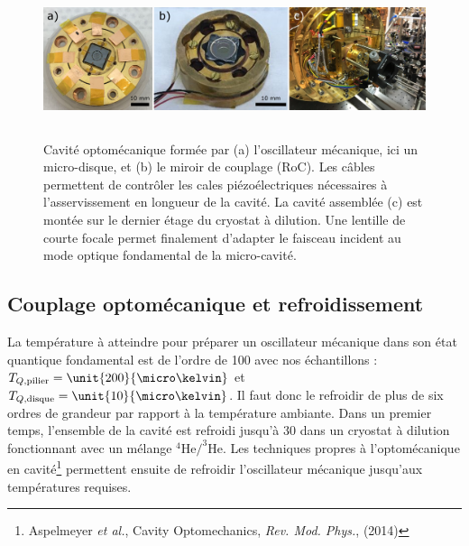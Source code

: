\documentclass[12pt,a4paper]{article}
\newcommand{\uroc}{\micro RoC}
\begin{document}
\begin{figure}
\center
\includegraphics[height=129pt]{figures/optomechanical_cavity.png}
\caption{Cavité optomécanique formée par (a) l'oscillateur mécanique, ici un micro-disque, et (b) le miroir de couplage (\uroc).
Les câbles permettent de contrôler les cales piézoélectriques nécessaires à l'asservissement en longueur de la cavité.
La cavité assemblée (c) est montée sur le dernier étage du cryostat à dilution.
Une lentille de courte focale permet finalement d'adapter le faisceau incident au mode optique fondamental de la micro-cavité.}
\label{fig:cavity}
\end{figure}

\subsection{Couplage optomécanique et refroidissement}
\label{sec:optomechanics}

La température à atteindre pour préparer un oscillateur mécanique dans son état quantique fondamental est de l'ordre de \unit{100}{\micro\kelvin} avec nos échantillons : $T_{Q,\mathrm{pilier}} = \unit{200}{\micro\kelvin}$ et $T_{Q,\mathrm{disque}} = \unit{10}{\micro\kelvin}$.
Il faut donc le refroidir de plus de six ordres de grandeur par rapport à la température ambiante.
Dans un premier temps, l'ensemble de la cavité est refroidi jusqu'à \unit{30}{\milli\kelvin} dans un cryostat à dilution fonctionnant avec un mélange $\mathrm{^4He/^3He}$.
Les techniques propres à l'optomécanique en cavité\footnote{Aspelmeyer \textit{et al.}, Cavity Optomechanics, \textit{Rev. Mod. Phys.}, (2014)} permettent ensuite de refroidir l'oscillateur mécanique jusqu'aux températures requises.
\end{document}
